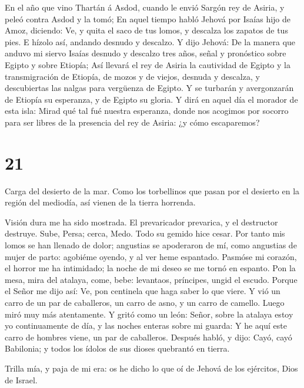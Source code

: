  En el año que vino Thartán á Asdod, cuando le envió Sargón
rey de Asiria, y peleó contra Asdod y la tomó;  En aquel
tiempo habló Jehová por Isaías hijo de Amoz, diciendo: Ve, y quita el
saco de tus lomos, y descalza los zapatos de tus pies. E hízolo así,
andando desnudo y descalzo.  Y dijo Jehová: De la manera que
anduvo mi siervo Isaías desnudo y descalzo tres años, señal y pronóstico
sobre Egipto y sobre Etiopía;  Así llevará el rey de Asiria
la cautividad de Egipto y la transmigración de Etiopía, de mozos y de
viejos, desnuda y descalza, y descubiertas las nalgas para vergüenza de
Egipto.  Y se turbarán y avergonzarán de Etiopía su
esperanza, y de Egipto su gloria.  Y dirá en aquel día el
morador de esta isla: Mirad qué tal fué nuestra esperanza, donde nos
acogimos por socorro para ser libres de la presencia del rey de Asiria:
¿y cómo escaparemos?

\hypertarget{section-20}{%
\section{21}\label{section-20}}

 Carga del desierto de la mar. Como los torbellinos que
pasan por el desierto en la región del mediodía, así vienen de la tierra
horrenda.

 Visión dura me ha sido mostrada. El prevaricador prevarica,
y el destructor destruye. Sube, Persa; cerca, Medo. Todo su gemido hice
cesar.  Por tanto mis lomos se han llenado de dolor;
angustias se apoderaron de mí, como angustias de mujer de parto:
agobiéme oyendo, y al ver heme espantado.  Pasmóse mi
corazón, el horror me ha intimidado; la noche de mi deseo se me tornó en
espanto.  Pon la mesa, mira del atalaya, come, bebe:
levantaos, príncipes, ungid el escudo.  Porque el Señor me
dijo así: Ve, pon centinela que haga saber lo que viere.  Y
vió un carro de un par de caballeros, un carro de asno, y un carro de
camello. Luego miró muy más atentamente.  Y gritó como un
león: Señor, sobre la atalaya estoy yo continuamente de día, y las
noches enteras sobre mi guarda:  Y he aquí este carro de
hombres viene, un par de caballeros. Después habló, y dijo: Cayó, cayó
Babilonia; y todos los ídolos de sus dioses quebrantó en tierra.

 Trilla mía, y paja de mi era: os he dicho lo que oí de
Jehová de los ejércitos, Dios de Israel.

